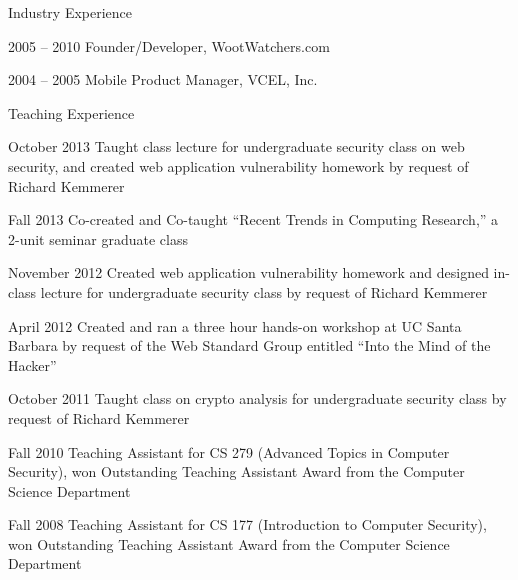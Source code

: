 \begin{vitae}
{\begin{vitaesection}{Industry Experience}
   \item [2005 -- 2010] Founder/Developer, WootWatchers.com

   \item [2004 -- 2005] Mobile Product Manager, VCEL, Inc.

\end{vitaesection}

\begin{vitaesection}{Teaching Experience}
\vspace{-0.1cm}

   \item [October 2013] Taught class lecture for undergraduate
     security class on web security, and created web application
     vulnerability homework by request of Richard Kemmerer

   \item [Fall 2013] Co-created and Co-taught “Recent Trends in
     Computing Research,” a 2-unit seminar graduate class

   \item [November 2012] Created web application vulnerability
     homework and designed in-class lecture for undergraduate security
     class by request of Richard Kemmerer

   \item [April 2012] Created and ran a three hour hands-on workshop
     at UC Santa Barbara by request of the Web Standard Group entitled
     ``Into the Mind of the Hacker'' 

   \item [October 2011] Taught class on crypto analysis for
     undergraduate security class by request of Richard Kemmerer

   \item [Fall 2010] Teaching Assistant for CS 279 (Advanced Topics in
     Computer Security), won Outstanding Teaching Assistant Award from
     the Computer Science Department


   \item [Fall 2008] Teaching Assistant for CS 177 (Introduction to
     Computer Security), won Outstanding Teaching Assistant Award from
     the Computer Science Department

\end{vitaesection}






}

\end{vitae}
